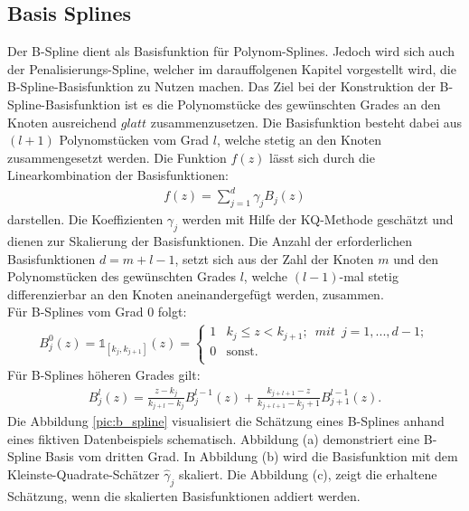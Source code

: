 \documentclass[12pt]{scrreprt}
\begin{document}
\subsection{Basis Splines}
Der B-Spline dient als Basisfunktion für Polynom-Splines. Jedoch wird sich auch der Penalisierungs-Spline, welcher im darauffolgenen Kapitel vorgestellt wird, die B-Spline-Basisfunktion zu Nutzen machen. Das Ziel bei der Konstruktion der B-Spline-Basisfunktion ist es die Polynomstücke des gewünschten Grades an den Knoten ausreichend $glatt$ zusammenzusetzen. Die Basisfunktion besteht dabei aus $(l+1)$ Polynomstücken vom Grad $l$, welche stetig an den Knoten zusammengesetzt werden. Die Funktion $f(z)$ lässt sich durch die Linearkombination der Basisfunktionen:
\begin{align}
f(z)=\sum_{j=1}^d\gamma_{j}B_{j}(z)
\end{align}
darstellen. Die Koeffizienten  $\gamma_{j}$ werden mit Hilfe der KQ-Methode geschätzt und dienen zur Skalierung der Basisfunktionen. Die Anzahl der erforderlichen Basisfunktionen $d = m+l-1$, setzt sich aus der Zahl der Knoten $m$ und den Polynomstücken des gewünschten Grades $l$, welche $(l-1)$-mal stetig differenzierbar an den Knoten aneinandergefügt werden, zusammen.  \\
Für B-Splines vom Grad 0 folgt:
\begin{align}
B_{j}^0(z)= \mathbb{1}_{[k_{j},k_{j+1}]}(z)= 
\begin{cases}
1 & k_{j} \leq z<k_{j+1};\enspace mit\enspace j=1,...,d-1; \\
0 & \text{sonst.} \\
\end{cases}
\end{align}
Für B-Splines höheren Grades gilt:
\begin{align}
B_{j}^l(z)= \frac{z-k_{j}}{k_{j+l}-k_{j}}B_{j}^{l-1}(z)+
\frac{k_{j+l+1}-z}{k_{j+l+1}-k_j+1}B_{j+1}^{l-1}(z).
\end{align}
Die Abbildung \ref{pic:b_spline} visualisiert die Schätzung eines B-Splines anhand eines fiktiven Datenbeispiels schematisch. Abbildung (a) demonstriert eine B-Spline Basis vom dritten Grad. In Abbildung (b) wird die Basisfunktion mit dem Kleinste-Quadrate-Schätzer $\hat\gamma_{j}$ skaliert. Die Abbildung (c), zeigt die erhaltene Schätzung, wenn die skalierten Basisfunktionen addiert werden.
\end{document}
